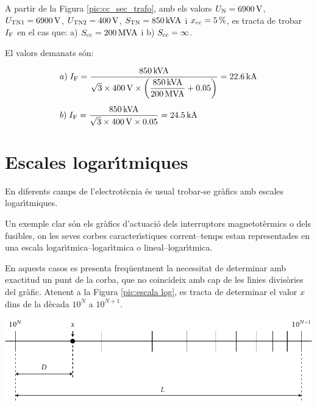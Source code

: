 \begin{exemple}
    A partir de la Figura \vref{pic:cc_sec_trafo}, amb els valors
    $U_\mathrm{N}=\SI{6900}{V}$, $U_\mathrm{TN1}=\SI{6900}{V}$,
    $U_\mathrm{TN2}=\SI{400}{V}$, $S_\mathrm{TN}=\SI{850}{kVA}$ i
    $x_\mathrm{cc}=\SI{5}{\%}$, es tracta de trobar $I_\mathrm{F}$ en el cas
    que: a) $S_\mathrm{cc}=\SI{200}{MVA}$ i b) $S_\mathrm{cc}=\infty$.

    El valors demanats s\'{o}n:

    \begin{align*}
       &a)\;I_\mathrm{F} = \frac{\SI{850}{kVA}}{\sqrt{3}\times \SI{400}{V}\times
       \left(\dfrac{\SI{850}{kVA}}{\SI{200}{MVA}} +
       \num{0,05}\right)} = \SI{22,6}{kA} \\[1ex]
       &b)\;I_\mathrm{F} = \frac{\SI{850}{kVA}}{\sqrt{3}\times \SI{400}{V}\times
       \num{0,05}} = \SI{24,5}{kA}
    \end{align*}
\end{exemple}


\section{Escales logar\'{\i}tmiques} 

En diferents camps de l'electrot\`{e}cnia \'{e}s usual trobar-se gr\`{a}fics amb escales
logar\'{\i}tmiques.

Un exemple clar s\'{o}n els gr\`{a}fics d'actuaci\'{o} dels interruptors magnetot\`{e}rmics o dels
fusibles, on les seves corbes caracter\'{\i}stiques corrent--temps estan representades en
una escala logar\'{\i}tmica--logar\'{\i}tmica o lineal--logar\'{\i}tmica.

En aquests casos es presenta freq\"{u}entment la necessitat de determinar amb exactitud un
punt de la corba, que no coincideix amb cap de les l\'{\i}nies divis\`{o}ries del gr\`{a}fic. Atenent a
la Figura \vref{pic:escala log}, es tracta de determinar el valor $x$ dins de la d\`{e}cada
$10^N$ a $10^{N+1}$.

\begin{center}
    \includegraphics{Imatges/Cap-CalcBas-EscalesLog.pdf}
    \label{pic:escala log}
\end{center}

